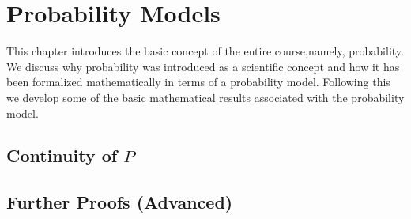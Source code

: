 \chapter{Probability Models}\label{chap:probability_models}
\minitoc
This chapter introduces the basic concept of the entire course,\linebreak namely, probability. We discuss why probability was introduced as a scientific concept and how it has been formalized mathematically in terms of a probability model. Following this we develop some of the basic mathematical results associated with the probability model.







\section{Continuity of $P$}
\lipsum[1-10]

\section{Further Proofs (Advanced)}\label{ch2:adv_proofs}
\lipsum[1-10]